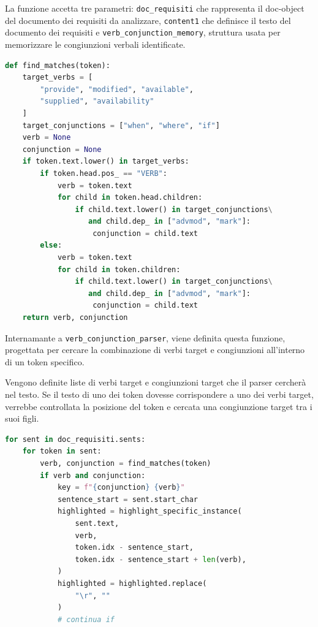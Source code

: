 \documentclass[12pt]{report}
\begin{document}
\noindent La funzione accetta tre parametri: \texttt{doc\_requisiti} che rappresenta il doc-object del documento dei requisiti da analizzare, \texttt{content1} che definisce il testo del documento dei requisiti e \texttt{verb\_conjunction\_memory}, struttura usata per memorizzare le congiunzioni verbali identificate.

\begin{mdframed}
\small
\begin{lstlisting}[language=Python]
def find_matches(token):
    target_verbs = [
        "provide", "modified", "available",
        "supplied", "availability"
    ]
    target_conjunctions = ["when", "where", "if"]
    verb = None
    conjunction = None
    if token.text.lower() in target_verbs:
        if token.head.pos_ == "VERB":
            verb = token.text
            for child in token.head.children:
                if child.text.lower() in target_conjunctions\
                   and child.dep_ in ["advmod", "mark"]:
                    conjunction = child.text
        else:
            verb = token.text
            for child in token.children:
                if child.text.lower() in target_conjunctions\
                   and child.dep_ in ["advmod", "mark"]:
                    conjunction = child.text
    return verb, conjunction
\end{lstlisting}
\end{mdframed}

\noindent Internamante a \texttt{verb\_conjunction\_parser}, viene definita questa funzione, progettata per cercare la combinazione di verbi target e congiunzioni all'interno di un token specifico.

Vengono definite liste di verbi target e congiunzioni target che il parser cercherà nel testo. Se il testo di uno dei token dovesse corrispondere a uno dei verbi target, verrebbe controllata la posizione del token e cercata una congiunzione target tra i suoi figli.


\begin{mdframed}
\small
\begin{lstlisting}[language=Python]
for sent in doc_requisiti.sents:
    for token in sent:
        verb, conjunction = find_matches(token)
        if verb and conjunction:
            key = f"{conjunction} {verb}"
            sentence_start = sent.start_char
            highlighted = highlight_specific_instance(
                sent.text,
                verb,
                token.idx - sentence_start,
                token.idx - sentence_start + len(verb),
            )
            highlighted = highlighted.replace(
                "\r", ""
            )
            # continua if
\end{lstlisting}
\end{mdframed}
\end{document}
